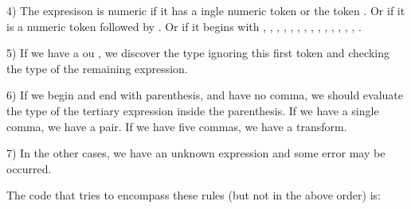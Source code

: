 {{{{{4) The expresison is numeric if it has a ingle numeric token or the
token . Or if it is a numeric token followed
by \monoespaco{/}. Or if it begins
with , , ,
,
, , , ,
, , , ,
, , .

5) If we have a \monoespaco{+} ou \monoespaco{-}, we discover the type
ignoring this first token and checking the type of the remaining
expression.

6) If we begin and end with parenthesis, and have no comma, we should
evaluate the type of the tertiary expression inside the
parenthesis. If we have a single comma, we have a pair. If we have
five commas, we have a transform.

7) In the other cases, we have an unknown expression and some error
may be occurred.

The code that tries to encompass these rules (but not in the above
order) is:

}}}}}
